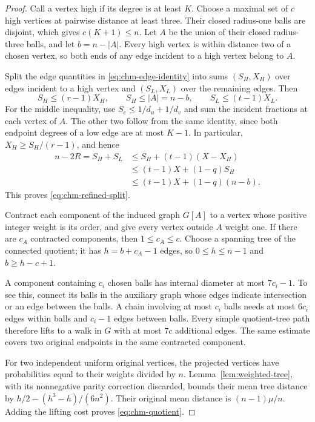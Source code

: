 \documentclass[11pt,a4paper]{article}
\theoremstyle{remark}\newtheorem{remark}[theorem]{Remark}
\begin{document}
\begin{proof}
Call a vertex high if its degree is at least $K$. Choose a maximal set
of $c$ high vertices at pairwise distance at least three. Their closed
radius-one balls are disjoint, which gives $c(K+1)\le n$. Let $A$ be
the union of their closed radius-three balls, and let $b=n-|A|$.
Every high vertex is within distance two of a chosen vertex, so both
ends of any edge incident to a high vertex belong to $A$.

Split the edge quantities in \eqref{eq:chm-edge-identity} into sums
$(S_H,X_H)$ over edges incident to a high vertex and $(S_L,X_L)$ over
the remaining edges. Then
\[
 S_H\le(r-1)X_H,\qquad S_H\le |A|=n-b,\qquad
 S_L\le(t-1)X_L.
\]
For the middle inequality, use
$S_e\le1/d_u+1/d_v$ and sum the incident fractions at each vertex
of $A$. The other two follow from the same identity, since both
endpoint degrees of a low edge are at most $K-1$. In particular,
$X_H\ge S_H/(r-1)$, and hence
\begin{align*}
 n-2R=S_H+S_L
 &\le S_H+(t-1)(X-X_H)\\
 &\le(t-1)X+(1-q)S_H\\
 &\le(t-1)X+(1-q)(n-b).
\end{align*}
This proves \eqref{eq:chm-refined-split}.

Contract each component of the induced graph $G[A]$ to a vertex whose
positive integer weight is its order, and give every vertex outside
$A$ weight one. If there are $c_A$ contracted components, then
$1\le c_A\le c$. Choose a spanning tree of the connected quotient;
it has $h=b+c_A-1$ edges, so $0\le h\le n-1$ and $b\ge h-c+1$.

A component containing $c_i$ chosen balls has internal diameter at
most $7c_i-1$. To see this, connect its balls in the auxiliary graph
whose edges indicate intersection or an edge between the balls. A
chain involving at most $c_i$ balls needs at most $6c_i$ edges within
balls and $c_i-1$ edges between balls. Every simple quotient-tree path
therefore lifts to a walk in $G$ with at most $7c$ additional edges.
The same estimate covers two original endpoints in the same
contracted component.

For two independent uniform original vertices, the projected
vertices have probabilities equal to their weights divided by $n$.
Lemma~\ref{lem:weighted-tree}, with its nonnegative parity correction
discarded, bounds their mean tree distance by
$h/2-(h^3-h)/(6n^2)$. Their original mean distance is
$(n-1)\mu/n$. Adding the lifting cost proves
\eqref{eq:chm-quotient}.
\end{proof}
\end{document}
